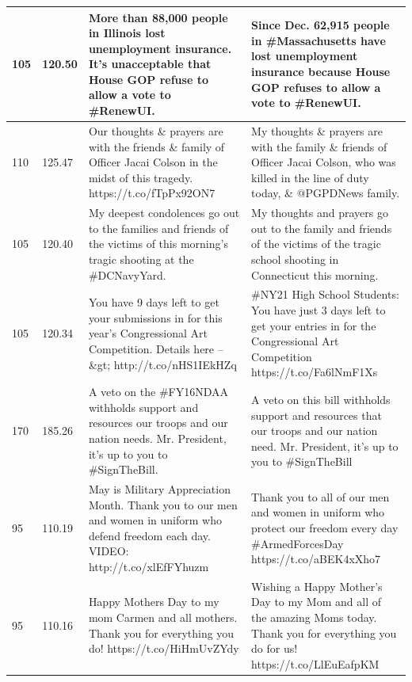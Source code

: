 \documentclass[11pt]{article}
\begin{document}
\begin{flushleft}
\begin{table}[]
\begin{tabular}{|p{}|p{}|p{}|p{}|}
105      & 120.50    & More than 88,000 people in Illinois lost unemployment insurance. It’s unacceptable that House GOP refuse to allow a vote to \#RenewUI.                   & Since Dec. 62,915 people in \#Massachusetts have lost unemployment insurance because House GOP refuses to allow a vote to \#RenewUI.                      \\ \hline
110      & 125.47    & Our thoughts \& prayers are with the friends \& family of Officer Jacai Colson in the midst of this tragedy. https://t.co/fTpPx92ON7             & My thoughts \& prayers are with the family \& friends of Officer Jacai Colson, who was killed in the line of duty today, \& @PGPDNews family. \\ \hline
105      & 120.40    & My deepest condolences go out to the families and friends of the victims of this morning’s tragic shooting at the \#DCNavyYard.                          & My thoughts and prayers go out to the family and friends of the victims of the tragic school shooting in Connecticut this morning.                        \\ \hline
105      & 120.34    & You have 9 days left to get your submissions in for this year’s Congressional Art Competition. Details here --\&gt; http://t.co/nHS1IEkHZq               & \#NY21 High School Students: You have just 3 days left to get your entries in for the Congressional Art Competition https://t.co/Fa6lNmF1Xs               \\ \hline
170      & 185.26    & A veto on the \#FY16NDAA withholds support and resources our troops and our nation needs. Mr. President, it's up to you to \#SignTheBill.                & A veto on this bill withholds support and resources that our troops and our nation need. Mr. President, it's up to you to \#SignTheBill                   \\ \hline
95       & 110.19    & May is Military Appreciation Month. Thank you to our men and women in uniform who defend freedom each day. VIDEO: http://t.co/xlEfFYhuzm                 & Thank you to all of our men and women in uniform who protect our freedom every day \#ArmedForcesDay https://t.co/aBEK4xXho7                               \\ \hline
95       & 110.16    & Happy Mothers Day to my mom Carmen and all mothers. Thank you for everything you do! https://t.co/HiHmUvZYdy                                             & Wishing a Happy Mother's Day to my Mom and all of the amazing Moms today. Thank you for everything you do for us! https://t.co/LlEuEafpKM                 \\ \hline

\end{tabular}
\end{table}
\end{flushleft}
\end{document}
